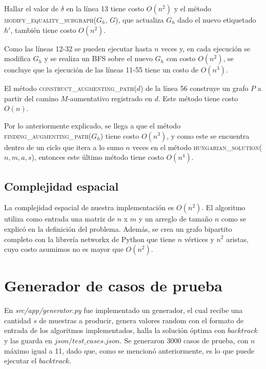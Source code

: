 \documentclass[10pt]{article} %
\begin{document}
Hallar el valor de $\delta$ en la l\'inea 13 tiene costo $O(n^2)$ y el m\'etodo \textsc{modify\_equality\_subgraph($G_h$, $G$)}, que actualiza $G_h$ dado el nuevo etiquetado $h'$, tambi\'en tiene costo $O(n^2)$. 

Como las l\'ineas 12-32 se pueden ejecutar hasta $n$ veces y, en cada ejecuci\'on se modifica $G_h$ y se realiza un BFS sobre el nuevo $G_h$ con costo $O(n^2)$, se concluye que la ejecuci\'on de las l\'ineas 11-55 tiene un costo de $O(n^3)$.

El m\'etodo \textsc{construct\_augmenting\_path($d$)} de la l\'inea 56 construye un grafo $P$ a partir del camino $M$-aumentativo registrado en $d$. Este m\'etodo tiene costo $O(n)$. 

Por lo anteriormente explicado, se llega a que el m\'etodo \textsc{finding\_augmenting\_path($G_h$)} tiene costo $O(n^3)$, y como este se encuentra dentro de un ciclo que itera a lo sumo $n$ veces en el m\'etodo \textsc{hungarian\_solution($n,m,a,s$)}, entonces este \'ultimo m\'etodo tiene costo $O(n^4)$.
	
	\subsection{Complejidad espacial}
	
	La complejidad espacial de nuestra implementaci\'on es $O(n^2)$. El algoritmo utiliza como entrada una matriz de $n$ x $m$ y un arreglo de tama\~no $n$ como se explic\'o en la definici\'on del problema. Adem\'as, se crea un grafo bipartito completo con la librer\'ia networkx de Python que tiene $n$ v\'ertices y $n^2$ aristas, cuyo costo asumimos no es mayor que $O(n^2)$.
	
	
	
	\section{Generador de casos de prueba}
	
	En \textit{src/app/generator.py} fue implementado un generador, el cual recibe una cantidad $ s $ de muestras a producir, genera valores random con el formato de entrada de los algoritmos implementados, halla la soluci\'on \'optima con $ backtrack $ y las guarda en $ json/test\_cases.json $. Se generaron 3000 casos de prueba, con $ n $ m\'aximo igual a 11, dado que, como se mencion\'o anteriormente, es lo que puede ejecutar el $ backtrack $.
	
\end{document}
